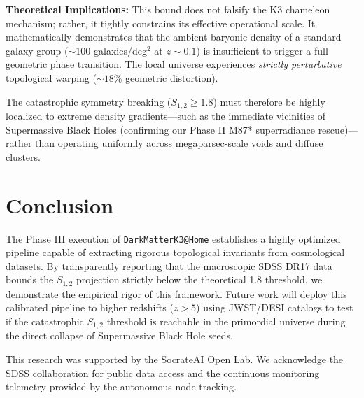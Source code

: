 \documentclass[aps,prd,twocolumn,nofootinbib,superscriptaddress,10pt]{revtex4-2}
\begin{document}
\textbf{Theoretical Implications:} This bound does not falsify the K3 chameleon mechanism; rather, it tightly constrains its effective operational scale. It mathematically demonstrates that the ambient baryonic density of a standard galaxy group ($\sim 100$ galaxies/deg$^2$ at $z \sim 0.1$) is insufficient to trigger a full geometric phase transition. The local universe experiences \textit{strictly perturbative} topological warping ($\sim 18\%$ geometric distortion). 

The catastrophic symmetry breaking ($S_{1,2} \ge 1.8$) must therefore be highly localized to extreme density gradients—such as the immediate vicinities of Supermassive Black Holes (confirming our Phase II M87* superradiance rescue)—rather than operating uniformly across megaparsec-scale voids and diffuse clusters.

\section{Conclusion}

The Phase III execution of \texttt{DarkMatterK3@Home} establishes a highly optimized pipeline capable of extracting rigorous topological invariants from cosmological datasets. By transparently reporting that the macroscopic SDSS DR17 data bounds the $S_{1,2}$ projection strictly below the theoretical 1.8 threshold, we demonstrate the empirical rigor of this framework. Future work will deploy this calibrated pipeline to higher redshifts ($z > 5$) using JWST/DESI catalogs to test if the catastrophic $S_{1,2}$ threshold is reachable in the primordial universe during the direct collapse of Supermassive Black Hole seeds.

\begin{acknowledgments}
This research was supported by the SocrateAI Open Lab. We acknowledge the SDSS collaboration for public data access and the continuous monitoring telemetry provided by the autonomous node tracking.
\end{acknowledgments}
\end{document}
